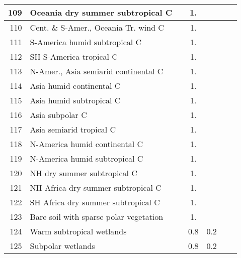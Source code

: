 {{\begin{tabular}{||r|l||c|c|c|c|c||}
 \hline
         109  & Oceania dry summer subtropical C                             &       &  1.   &       &       \\
 \hline
         110  & Cent. \& S-Amer., Oceania Tr. wind C                         &       &  1.   &       &       \\
 \hline
         111  & S-America humid subtropical C                                &       &  1.   &       &       \\
 \hline
         112  & SH S-America tropical C                                      &       &  1.   &       &       \\
 \hline
         113  & N-Amer., Asia semiarid continental C                         &       &  1.   &       &       \\
 \hline
         114  & Asia humid continental C                                     &       &  1.   &       &       \\
 \hline
         115  & Asia humid subtropical C                                     &       &  1.   &       &       \\
 \hline
         116  & Asia subpolar C                                              &       &  1.   &       &       \\
 \hline
         117  & Asia semiarid tropical C                                     &       &  1.   &       &       \\
 \hline
         118  & N-America humid continental C                                &       &  1.   &       &       \\
 \hline
         119  & N-America humid subtropical C                                &       &  1.   &       &       \\
 \hline
         120  & NH dry summer subtropical C                                  &       &  1.   &       &       \\
 \hline
         121  & NH Africa dry summer subtropical C                           &       &  1.   &       &       \\
 \hline
         122  & SH Africa dry summer subtropical C                           &       &  1.   &       &       \\
 \hline
 \hline
         123  & Bare soil with sparse polar vegetation                       &       &  1.   &       &       \\
 \hline
 \hline
         124  & Warm subtropical wetlands                                    &       &  0.8  &  0.2  &       \\
 \hline
         125  & Subpolar wetlands                                            &       &  0.8  &  0.2  &       \\

\end{tabular}}}
